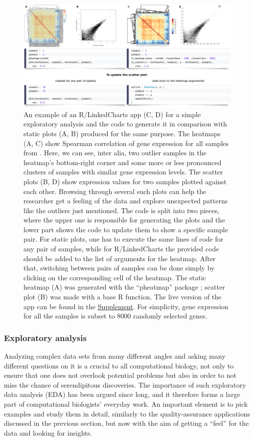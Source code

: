 \documentclass[twocolumn,10pt]{article}
\newcommand{\Supplement}{\href{https://anders-biostat.github.io/lc-paper/}{Supplement}}
\begin{document}
\begin{figure}[b]
	\includegraphics[width=\textwidth]{FigE/figE.png}
	\caption{An example of an R/LinkedCharts app (C, D) for a simple exploratory analysis and the code to generate it in comparison with static plots (A, B) produced for the same purpose.  The heatmaps (A, C) show Spearman correlation of gene expression for all samples from \citet{conway_2015}. Here, we can see, inter alia, two outlier samples in the heatmap's bottom-right corner and some more or less pronounced clusters of samples with similar gene expression levels. The scatter plots (B, D) show expression values for two samples plotted against each other. Browsing through several such plots can help the researcher get a feeling of the data and explore unexpected patterns like the outliers just mentioned. The code is split into two pieces, where the upper one is responsible for generating the plots and the lower part shows the code to update them to show a specific sample pair. For static plots, one has to execute the same lines of code for any pair of samples, while for R/LinkedCharts the provided code should be added to the list of arguments for the heatmap. After that, switching between pairs of samples can be done simply by clicking on the corresponding cell of the heatmap. The static heatmap (A) was generated with the ``pheatmap'' package  \citep{kolde_2019}; scatter plot (B) was made with a base R function. The live version of the app can be found in the \Supplement. For simplicity, gene expression for all the samples is subset to 8000 randomly selected genes.}
	\label{FigE}
\end{figure}

\subsubsection{Exploratory analysis}

Analyzing complex data sets from many different angles and asking many different questions on it is a crucial to all computational biology, not only to ensure that one does not overlook potential problems but also in order to not miss the chance of serendipitous discoveries. The importance of such exploratory data analysis (EDA) has been argued since long, and it therefore forms a large part of computational biologists' everyday work. An important element is to pick examples and study them in detail, similarly to the quality-assurance applications discussed in the previous section, but now with the aim of getting a ``feel'' for the data and looking for insights.
\end{document}
